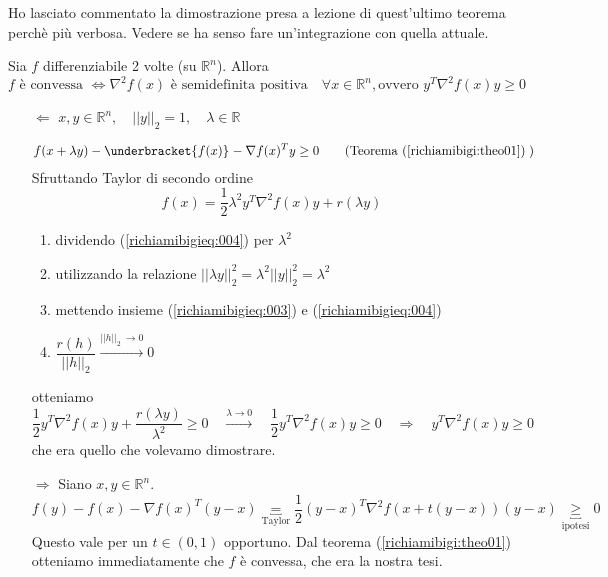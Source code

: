 \begin{todo}
Ho lasciato commentato la dimostrazione presa a lezione
di quest'ultimo teorema perch\`e pi\`u verbosa. Vedere se ha senso
 fare un'integrazione con quella attuale.
\end{todo}

\begin{theo}
\label{richiamibigi:theo02} 
Sia $f$ differenziabile 2 volte (su $\mathbb{R}^{n}$). Allora
 $$ f \text { è convessa } \Longleftrightarrow \nabla^{2} f(x) \text{ è semidefinita positiva} \quad \forall x \in \mathbb{R}^{n},
\text{ovvero } y^{T}\nabla^{2}f(x)y \geq 0
$$
\end{theo}

\begin{thproof}
\begin{itemize}
\item[$ \Longleftarrow$]
 $x,y \in \mathbb{R}^{n}, \quad ||y||_{2} = 1, \quad \lambda  \in \mathbb{R}$

\begin{equation}
  \label{richiamibigieq:003}
f(x+ \lambda y) - \underbracket{f(x)}_{} -\nabla f(x)^{T}y \geq 0
\qquad (\text{Teorema } (\ref{richiamibigi:theo01})\;)   
\end{equation}
Sfruttando Taylor di secondo ordine
\begin{equation}
  \label{richiamibigieq:004}
  f(x) = \frac{1}{2} \lambda^{2} y^{T} \nabla^2 f(x) y + r(\lambda y)
\end{equation}
\begin{enumerate}
\item dividendo (\ref{richiamibigieq:004}) per $\lambda^{2}$
 \item utilizzando la relazione
$||\lambda y||_{2}^{2} = \lambda^{2} ||y||_{2}^{2} = \lambda^{2}$
 \item mettendo insieme (\ref{richiamibigieq:003})  e (\ref{richiamibigieq:004})
\item $\dfrac{r(h)}{||h||_{2}} \xrightarrow{|| h||_{2} \ \to 0} 0$
\end{enumerate}
otteniamo
$$ \frac{1}{2} y^{T} \nabla^{2}f(x) y   + \frac{r(\lambda y)}{\lambda^2}  \geq  0
\quad
\xrightarrow{\lambda \to 0} 
\quad
 \frac{1}{2} y^{T} \nabla^{2}f(x) y   \geq  0
\quad
\Longrightarrow \quad
y^{T} \nabla^{2} f(x) y \geq 0 
$$
che era quello che volevamo dimostrare.

\item[$\Longrightarrow$]
 Siano $x,y \in \mathbb{R}^{n}$. 
$$f(y) - f(x) - \nabla f(x)^{T}(y-x)
\underbracket{ =}_{\text{Taylor}} \frac{1}{2} (y-x)^{T} \nabla^{2} f(x + t(y-x))(y-x) \underbracket{\geq}_{\text{ipotesi}} 0$$
 Questo vale per un $t \in (0,1)$ opportuno.
Dal teorema (\ref{richiamibigi:theo01}) otteniamo immediatamente
che $f$ \`e convessa, che era la nostra tesi.
\end{itemize}
\end{thproof}

